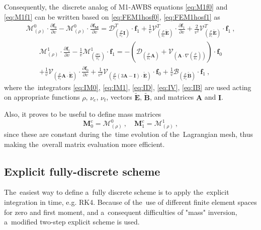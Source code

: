 \documentclass[review]{elsarticle}
\newcommand{\pdv}[2]{\frac{\partial{#1}}{\partial{#2}}}
\newcommand{\vect}[1]{\boldsymbol{#1}}
\newcommand{\matr}[1]{\mathbf{#1}}
\newcommand{\nue}{\nu_{e}}
\newcommand{\nutot}{\nu_{t}}
\newcommand{\vmag}{v}
\newcommand{\tE}{\vect{\tilde{E}}}
\newcommand{\tB}{\vect{\tilde{B}}}
\newcommand{\fM}{f_M}
\newcommand{\vfzero}{\vect{f}_0}
\newcommand{\fone}{\vect{f}_1}
\newcommand{\MI}{\matr{I}}
\newcommand{\MA}{\matr{A}}
\newcommand{\IM}{\boldsymbol{\mathcal{M}}}
\newcommand{\ID}{\boldsymbol{\mathcal{D}}}
\newcommand{\IV}{\boldsymbol{\mathcal{V}}}
\newcommand{\IB}{\boldsymbol{\mathcal{B}}}
\begin{document}
Consequently, the~discrete analog of M1-AWBS equations
\eqref{eq:M1f0} and \eqref{eq:M1f1} can be written based on 
 \eqref{eq:FEM1hosf0}, \eqref{eq:FEM1hosf1} as
\begin{multline}
  \IM^0_{(\rho)} \cdot \pdv{\vfzero}{\vmag} 
  - \IM^0_{(\rho)} \cdot \pdv{\vect{\fM}}{\vmag}
  = 
  \ID^T_{\left(\frac{\rho}{\nue}\MI\right)} \cdot \fone
  + \frac{1}{\vmag}\IV^T_{\left(\frac{\rho}{\nue}\tE\right)} \cdot 
  \pdv{\fone}{\vmag} 
  + \frac{2}{\vmag^2}\IV^T_{\left(\frac{\rho}{\nue}\tE\right)} \cdot \fone~,  
  \label{eq:semiM1hosf0}
\end{multline}
\begin{multline}
  \IM^1_{(\rho)} \cdot \pdv{\fone}{\vmag} 
  - \frac{1}{\vmag}\IM^1_{\left( \frac{\rho \nutot}{\nue} \right)} 
  \cdot \fone 
  = 
  - \left(\ID_{\left(\frac{\rho}{\nue}\MA\right)}  
  + \IV_{\left( \MA \cdot \nabla\left(\frac{\rho}{\nue}\right) \right)}\right) 
  \cdot \vfzero \\ 
  + \frac{1}{\vmag}\IV_{\left(\frac{\rho}{\nue}\MA \cdot \tE\right)} \cdot
  \pdv{\vfzero}{\vmag}
  + \frac{1}{\vmag^2}\IV_{\left(\frac{\rho}{\nue} 
  \left( 3\MA - \MI \right) \cdot \tE \right)} \cdot \vfzero
  + \frac{1}{\vmag}\IB_{\left( \frac{\rho}{\nue}\tB \right)} \cdot \fone~,
  \label{eq:semiM1hosf1}
\end{multline}
where the~integrators \eqref{eq:IM0}, \eqref{eq:IM1},
\eqref{eq:ID}, \eqref{eq:IV}, \eqref{eq:IB} are used acting on appropriate
functions $\rho$, $\nue$, $\nutot$, vectors $\tE$, $\tB$, and matrices $\MA$
and $\MI$.

Also, it proves to be useful to define mass matrices
\begin{equation}
  \matr{M}_0^c = \IM^0_{(\rho)}~,\quad \matr{M}_1^c = \IM^1_{(\rho)}~,
  \label{eq:massmatrices} 
\end{equation}
since these are constant during the~time evolution of the~Lagrangian mesh,
thus making the~overall matrix evaluation more efficient.

\subsection{Explicit fully-discrete scheme}\label{sec:expl_fullydiscrete_scheme}
The~easiest way to define a~fully discrete scheme is to apply the~explicit
integration in time, e.g. RK4.
Because of the~use of different finite element spaces for zero and first moment,
and a~consequent difficulties of "mass" inversion, a~modified two-step explicit
scheme is used.
\end{document}
